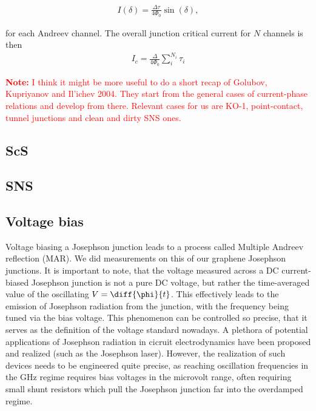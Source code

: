 \begin{eqnarray}
I(\delta)=\frac{\Delta\tau}{4\Phi_0}\sin(\delta),
\end{eqnarray}

for each Andreev channel. The overall junction critical current for $N$ channels is then 
\begin{eqnarray}
	I_c=\frac{\Delta}{4\Phi_0}\sum_{i}^{N_i}\tau_i
\end{eqnarray}

\textcolor{red}{\textbf{Note:} I think it might be more useful to do a short recap of Golubov, Kupriyanov and Il'ichev 2004. 
They start from the general cases of current-phase relations and develop from there.
Relevant cases for us are KO-1, point-contact, tunnel junctions and clean and dirty SNS ones.}

\subsection{ScS}


\subsection{SNS}

\subsection{Voltage bias}
Voltage biasing a Josephson junction leads to a process called Multiple Andreev reflection (MAR).
We did measurements on this of our graphene Josephson junctions.
It is important to note, that the voltage measured across a DC current-biased Josephson junction is not a pure DC voltage, but rather the time-averaged value of the oscillating $V=\diff{\phi}{t}$.
This effectively leads to the emission of Josephson radiation from the junction, with the frequency being tuned via the bias voltage.
This phenomenon can be controlled so precise, that it serves as the definition of the voltage standard nowadays.
A plethora of potential applications of Josephson radiation in cicruit electrodynamics have been proposed and realized (such as the Josephson laser).
However, the realization of such devices needs to be engineered quite precise, as reaching oscillation frequencies in the GHz regime requires bias voltages in the microvolt range, often requiring small shunt resistors which pull the Josephson junction far into the overdamped regime.